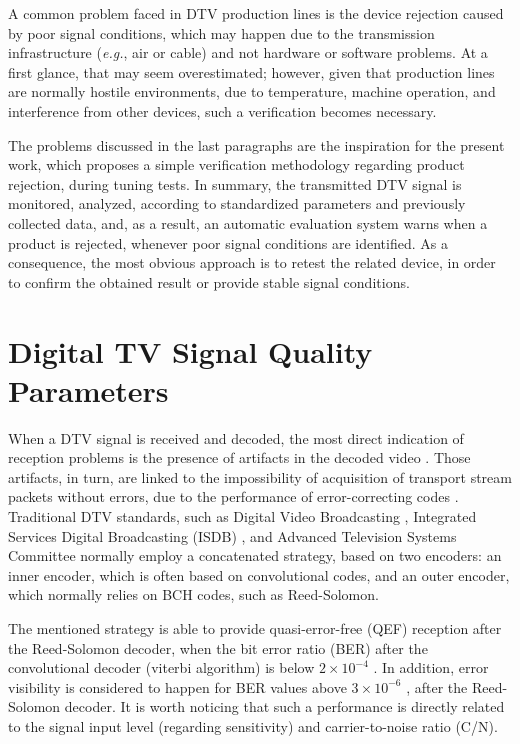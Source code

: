 \documentclass[conference]{IEEEtran}
\begin{document}
A common problem faced in DTV production lines is the device rejection caused by poor signal conditions, which may happen due to the transmission infrastructure ({\it e.g.}, air or cable) and not hardware or software problems. At a first glance, that may seem overestimated; however, given that production lines are normally hostile environments, due to temperature, machine operation, and interference from other devices, such a verification becomes necessary.

The problems discussed in the last paragraphs are the inspiration for the present work, which proposes a simple verification methodology regarding product rejection, during tuning tests. In summary, the transmitted DTV signal is monitored, analyzed, according to standardized parameters and previously collected data, and, as a result, an automatic evaluation system warns when a product is rejected, whenever poor signal conditions are identified. As a consequence, the most obvious approach is to retest the related device, in order to confirm the obtained result or provide stable signal conditions. %

\section{Digital TV Signal Quality Parameters}\label{measure}
When a DTV signal is received and decoded, the most direct indication of reception problems is the presence of artifacts in the decoded video \cite{keith}. Those artifacts, in turn, are linked to the impossibility of acquisition of transport stream packets \cite{reimers,iso13818_1} without errors, due to the performance of error-correcting codes \cite{keith,reimers}. Traditional DTV standards, such as Digital Video Broadcasting \cite{dvb}, Integrated Services Digital Broadcasting (ISDB) \cite{isdb}, and Advanced Television Systems Committee \cite{atsc} normally employ a concatenated strategy, based on two encoders: an inner encoder, which is often based on convolutional codes, and an outer encoder, which normally relies on BCH codes, such as Reed-Solomon.

The mentioned strategy is able to provide quasi-error-free (QEF) reception after the Reed-Solomon decoder, when the bit error ratio (BER) after the convolutional decoder (viterbi algorithm) is below $2\times 10^{-4}$ \cite{dvb}. In addition, error visibility is considered to happen for BER values above $3\times 10^{-6}$ \cite{fcc}, after the Reed-Solomon decoder. It is worth noticing that such a performance is directly related to the signal input level (regarding sensitivity) and carrier-to-noise ratio (C/N).
\end{document}
